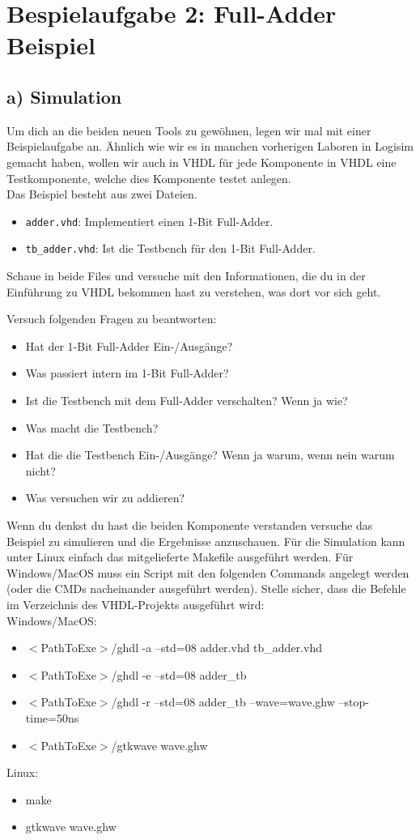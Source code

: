 \documentclass[a4paper]{scrartcl}
\begin{document}
\section*{Bespielaufgabe 2: Full-Adder Beispiel}
\subsection*{a) Simulation}
Um dich an die beiden neuen Tools zu gewöhnen, legen wir mal mit einer Beispielaufgabe an.
Ähnlich wie wir es in manchen vorherigen Laboren in Logisim gemacht haben, wollen wir auch in VHDL
für jede Komponente in VHDL eine Testkomponente, welche dies Komponente testet anlegen.\\

Das Beispiel besteht aus zwei Dateien. 
\begin{itemize}
  \item \texttt{adder.vhd}: Implementiert einen 1-Bit Full-Adder.
  \item \texttt{tb\_adder.vhd}: Ist die Testbench für den 1-Bit Full-Adder.
\end{itemize}
Schaue in beide Files und versuche mit den Informationen, die du in der Einführung zu VHDL bekommen hast zu verstehen, was dort vor sich geht.

Versuch folgenden Fragen zu beantworten:
\begin{itemize}
  \item Hat der 1-Bit Full-Adder Ein-/Ausgänge?
  \item Was passiert intern im 1-Bit Full-Adder?
  \item Ist die Testbench mit dem Full-Adder verschalten? Wenn ja wie?
  \item Was macht die Testbench?
  \item Hat die die Testbench Ein-/Ausgänge? Wenn ja warum, wenn nein warum nicht?
  \item Was versuchen wir zu addieren?
\end{itemize}

Wenn du denkst du hast die beiden Komponente verstanden versuche das Beispiel zu simulieren und die Ergebnisse anzuschauen.
Für die Simulation kann unter Linux einfach das mitgelieferte Makefile ausgeführt werden. Für Windows/MacOS muss ein Script mit den folgenden Commands angelegt werden (oder 
die CMDs nacheinander ausgeführt werden).
Stelle sicher, dass die Befehle im Verzeichnis des VHDL-Projekts ausgeführt wird:\\
Windows/MacOS:
\begin{itemize}
  \item $<$PathToExe$>$/ghdl -a --std=08 adder.vhd tb\_adder.vhd
	\item $<$PathToExe$>$/ghdl -e --std=08 adder\_tb
	\item $<$PathToExe$>$/ghdl -r --std=08 adder\_tb --wave=wave.ghw --stop-time=50ns
	\item $<$PathToExe$>$/gtkwave wave.ghw
\end{itemize}
Linux:
\begin{itemize}
  \item make
	\item gtkwave wave.ghw
\end{itemize}
\end{document}
